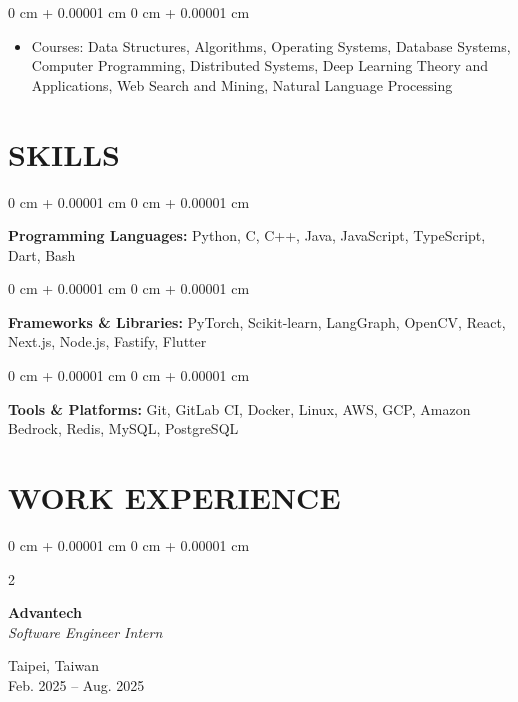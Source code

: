 \documentclass[11pt, letterpaper]{article}
\newcommand{\titlesep}{0.12cm}
\newcommand{\skillsep}{0.16cm}
\newenvironment{highlights}{
    \begin{itemize}[
        topsep=0pt,
        parsep=0pt,
        partopsep=0pt,
        itemsep=0.10cm,
        leftmargin=*,
        labelindent=10pt
    ]
}{
    \end{itemize}
} %
\newenvironment{onecolentry}{
    \begin{adjustwidth}{
        0 cm + 0.00001 cm
    }{
        0 cm + 0.00001 cm
    }
}{
    \end{adjustwidth}
} %
\newenvironment{twocolentry}[2][]{
    \onecolentry
    \def\secondColumn{#2}
    \setcolumnwidth{\fill, 4.5 cm}
    \begin{paracol}{2}
}{
    \switchcolumn \raggedleft \secondColumn
    \end{paracol}
    \endonecolentry
} %
\begin{document}
    \vspace{\titlesep}
    \begin{onecolentry}
        \begin{highlights}
            \item Courses: Data Structures, Algorithms, Operating Systems, Database Systems, Computer Programming, Distributed Systems, Deep Learning Theory and Applications, Web Search and Mining, Natural Language Processing
        \end{highlights}
    \end{onecolentry}

    \section{SKILLS}

    \begin{onecolentry}
        \textbf{Programming Languages:} Python, C, C++, Java, JavaScript, TypeScript, Dart, Bash
    \end{onecolentry}

    \vspace{\skillsep}
    \begin{onecolentry}
        \textbf{Frameworks \& Libraries:} PyTorch, Scikit-learn, LangGraph, OpenCV, React, Next.js, Node.js, Fastify, Flutter
    \end{onecolentry}

    \vspace{\skillsep}
    \begin{onecolentry}
        \textbf{Tools \& Platforms:} Git, GitLab CI, Docker, Linux, AWS, GCP, Amazon Bedrock, Redis, MySQL, PostgreSQL
    \end{onecolentry}

    \section{WORK EXPERIENCE}

    \begin{twocolentry}{
        Taipei, Taiwan\\
        Feb. 2025 – Aug. 2025
    }
        \textbf{Advantech}\\
        \textit{Software Engineer Intern}
    \end{twocolentry}
\end{document}
